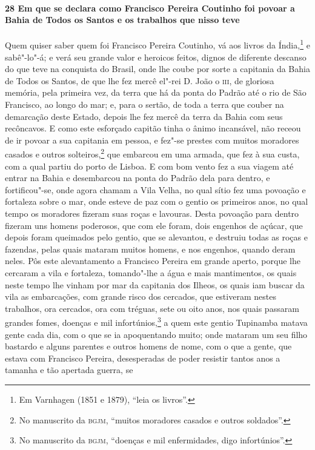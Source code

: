 \begin{linenumbers}
\paragraph{28 Em que se declara como Francisco Pereira Coutinho foi povoar a Bahia de
Todos os Santos e os trabalhos que nisso teve} \quad
Quem quiser saber quem foi Francisco Pereira Coutinho, vá aos livros da Índia,\footnote{
Em Varnhagen (1851 e 1879), ``leia os livros''.} e sabê"-lo"-á; e verá seu grande valor e
heroicos feitos, dignos de diferente descanso do que teve na conquista do Brasil, onde lhe
coube por sorte a capitania da Bahia de Todos os Santos, de que lhe fez mercê el"-rei D.
João o \textsc{iii}, de gloriosa memória, pela primeira vez, da terra que há da ponta do
Padrão até o rio de São Francisco, ao longo do mar; e, para o sertão, de toda a terra que
couber na demarcação deste Estado, depois lhe fez mercê da terra da Bahia com seus
recôncavos. E como este esforçado capitão tinha o ânimo incansável, não receou de ir
povoar a sua capitania em pessoa, e fez"-se prestes com muitos moradores casados e outros
solteiros,\footnote{ No manuscrito da \textsc{bgjm}, ``muitos moradores casados e outros
soldados''.} que embarcou em uma armada, que fez à sua custa, com a qual partiu do porto
de Lisboa. E com bom vento fez a sua viagem até entrar na Bahia e desembarcou na ponta do
Padrão dela para dentro, e fortificou"-se, onde agora chamam a Vila Velha, no qual sítio
fez uma povoação e fortaleza sobre o mar, onde esteve de paz com o gentio os primeiros
anos, no qual tempo os moradores fizeram suas roças e lavouras. Desta povoação para dentro
fizeram uns homens poderosos, que com ele foram, dois engenhos de açúcar, que depois foram
queimados pelo gentio, que se alevantou, e destruiu todas as roças e fazendas, pelas quais
mataram muitos homens, e nos engenhos, quando deram neles. Pôs este alevantamento a
Francisco Pereira em grande aperto, porque lhe cercaram a vila e fortaleza, tomando"-lhe a
água e mais mantimentos, os quais neste tempo lhe vinham por mar da capitania dos Ilheos,
os quais iam buscar da vila as embarcações, com grande risco dos cercados, que estiveram
nestes trabalhos, ora cercados, ora com tréguas, sete ou oito anos, nos quais passaram
grandes fomes, doenças e mil infortúnios,\footnote{ No manuscrito da \textsc{bgjm},
``doenças e mil enfermidades, digo infortúnios''.} a quem este gentio Tupinamba matava
gente cada dia, com o que se ia apoquentando muito; onde mataram um seu filho bastardo e
alguns parentes e outros homens de nome, com o que a gente, que estava com Francisco
Pereira, desesperadas de poder resistir tantos anos a tamanha e tão apertada guerra, se

\end{linenumbers}
